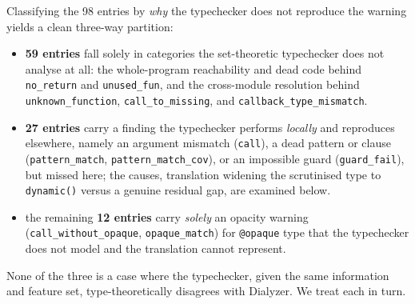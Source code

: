 Classifying the 98 entries by \emph{why} the typechecker does not reproduce the warning yields a clean three-way partition:
\begin{itemize}
  \item \textbf{59 entries} fall solely in categories the set-theoretic typechecker does not analyse at all: the whole-program reachability and dead code behind \texttt{no\_return} and \texttt{unused\_fun}, and the cross-module resolution behind \texttt{unknown\_function}, \texttt{call\_to\_missing}, and \texttt{callback\_type\_mismatch}.
  \item \textbf{27 entries} carry a finding the typechecker performs \emph{locally} and reproduces elsewhere, namely an argument mismatch (\texttt{call}), a dead pattern or clause (\texttt{pattern\_match}, \texttt{pattern\_match\_cov}), or an impossible guard (\texttt{guard\_fail}), but missed here; the causes, translation widening the scrutinised type to \texttt{dynamic()} versus a genuine residual gap, are examined below.
  \item the remaining \textbf{12 entries} carry \emph{solely} an opacity warning (\texttt{call\_without\_opaque}, \texttt{opaque\_match}) for \texttt{@opaque} type that the typechecker does not model and the translation cannot represent.
\end{itemize}
None of the three is a case where the typechecker, given the same information and feature set, type-theoretically disagrees with Dialyzer. We treat each in turn.


